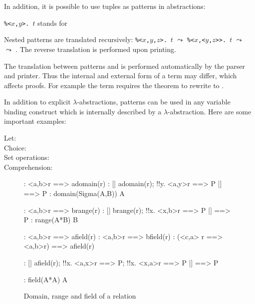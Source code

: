 In addition, it is possible to use tuples as patterns in abstractions:
\begin{center}
{\tt\%<$x$,$y$>. $t$} \quad stands for\quad {}
\end{center}
Nested patterns are translated recursively:
{\tt\%<$x$,$y$,$z$>. $t$} $\leadsto$ {\tt\%<$x$,<$y$,$z$>>. $t$} $\leadsto$
 $\leadsto$ .  The reverse translation is performed upon printing.
\begin{warn}
  The translation between patterns and  is performed automatically
  by the parser and printer.  Thus the internal and external form of a term
  may differ, which affects proofs.  For example the term  requires the theorem  to rewrite to
  {\tt<b,a>}.
\end{warn}
In addition to explicit $\lambda$-abstractions, patterns can be used in any
variable binding construct which is internally described by a
$\lambda$-abstraction.  Here are some important examples:
\begin{description}
\item[Let:] 
\item[Choice:] 
\item[Set operations:] 
\item[Comprehension:] 
\end{description}



\begin{figure}
\begin{alltt*}\isastyleminor
{}:     <a,b>\isasymin{}r ==> a\isasymin{}domain(r)
:     [| a\isasymin{}domain(r); !!y. <a,y>\isasymin{}r ==> P |] ==> P
: domain(Sigma(A,B)) \isasymsubseteq A

:      <a,b>\isasymin{}r ==> b\isasymin{}range(r)
:      [| b\isasymin{}range(r); !!x. <x,b>\isasymin{}r ==> P |] ==> P
: range(A*B) \isasymsubseteq B

:     <a,b>\isasymin{}r ==> a\isasymin{}field(r)
:     <a,b>\isasymin{}r ==> b\isasymin{}field(r)
:     (<c,a> \isasymnotin r ==> <a,b>\isasymin{}r) ==> a\isasymin{}field(r)

:      [| a\isasymin{}field(r); 
                !!x. <a,x>\isasymin{}r ==> P; 
                !!x. <x,a>\isasymin{}r ==> P      
             |] ==> P

:  field(A*A) \isasymsubseteq A
\end{alltt*}
\caption{Domain, range and field of a relation} \label{zf-domrange}
\end{figure}

